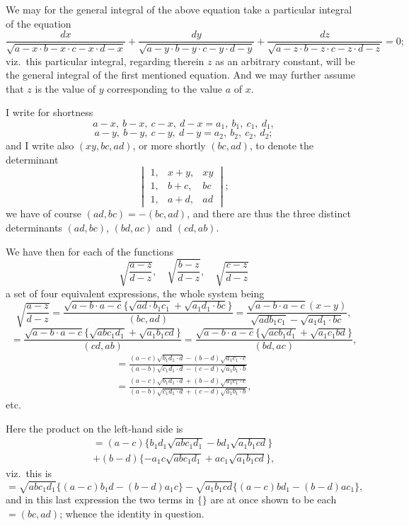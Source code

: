 \documentclass[11pt,a4paper]{book}
\begin{document}
We may for the general integral of the above equation take a particular integral of the equation
\[
\frac{dx}{\sqrt{a - x \cdot b - x \cdot c - x \cdot d - x}} + \frac{dy}{\sqrt{a - y \cdot b - y \cdot c - y \cdot d - y}} + \frac{dz}{\sqrt{a - z \cdot b - z \cdot c - z \cdot d - z}} = 0;
\]
viz.\ this particular integral, regarding therein $z$ as an arbitrary constant, will be the general integral of the first mentioned equation. And we may further assume that $z$ is the value of $y$ corresponding to the value $a$ of $x$.

I write for shortness
\[
a - x, \ b - x, \ c - x, \ d - x = a_1, \ b_1, \ c_1, \ d_1,
\]
\[
a - y, \ b - y, \ c - y, \ d - y = a_2, \ b_2, \ c_2, \ d_2;
\]
and I write also $(xy, bc, ad)$, or more shortly $(bc, ad)$, to denote the determinant
\[
\begin{vmatrix}
1, & x + y, & xy \\
1, & b + c, & bc \\
1, & a + d, & ad
\end{vmatrix};
\]
we have of course $(ad, bc) = -(bc, ad)$, and there are thus the three distinct determinants $(ad, bc)$, $(bd, ac)$ and $(cd, ab)$.

We have then for each of the functions
\[
\sqrt{\frac{a - z}{d - z}}, \quad \sqrt{\frac{b - z}{d - z}}, \quad \sqrt{\frac{c - z}{d - z}}
\]
a set of four equivalent expressions, the whole system being
\[
\sqrt{\frac{a - z}{d - z}} = \frac{\sqrt{a - b \cdot a - c}\{\sqrt{ad \cdot b_1c_1} + \sqrt{a_1d_1 \cdot bc}\}}{(bc, ad)} = \frac{\sqrt{a - b \cdot a - c}(x - y)}{\sqrt{adb_1c_1} - \sqrt{a_1d_1 \cdot bc}},
\]
\[
= \frac{\sqrt{a - b \cdot a - c}\{\sqrt{abc_1d_1} + \sqrt{a_1b_1cd}\}}{(cd, ab)} = \frac{\sqrt{a - b \cdot a - c}\{\sqrt{acb_1d_1} + \sqrt{a_1c_1bd}\}}{(bd, ac)},
\]
\begin{multline*}
= \frac{(a - c)\sqrt{b_1d_1 \cdot d} - (b - d)\sqrt{a_1c_1 \cdot c}}{(a - b)\sqrt{c_1d_1 \cdot d} - (c - d)\sqrt{a_1b_1 \cdot b}} \\
= \frac{(a - c)\sqrt{b_1d_1 \cdot d} + (b - d)\sqrt{a_1c_1 \cdot c}}{(a - b)\sqrt{c_1d_1 \cdot d} + (c - d)\sqrt{a_1b_1 \cdot b}},
\end{multline*}
etc.

\clearpage
Here the product on the left-hand side is
\begin{multline*}
= (a - c)\{b_1d_1\sqrt{abc_1d_1} - bd_1\sqrt{a_1b_1cd}\} \\
+ (b - d)\{-a_1c\sqrt{abc_1d_1} + ac_1\sqrt{a_1b_1cd}\},
\end{multline*}
viz.\ this is
\[
= \sqrt{abc_1d_1}\{(a - c)b_1d - (b - d)a_1c\} - \sqrt{a_1b_1cd}\{(a - c)bd_1 - (b - d)ac_1\},
\]
and in this last expression the two terms in $\{\}$ are at once shown to be each $= (bc, ad)$; whence the identity in question.
\end{document}
